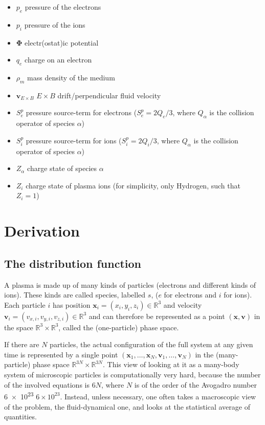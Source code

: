 \documentclass[12pt]{article}
\begin{document}
\begin{itemize}
    \item $p_e$ pressure of the electrons
    \item $p_i$ pressure of the ions
    \item $\bm{\Phi}$ electr(ostat)ic potential
    \item $q_e$ charge on an electron
    \item $\rho_m$ mass density of the medium
    \item $\bm{v}_{E \times B}$ $E \times B$ drift/perpendicular fluid velocity
    \item $S_e^p$ pressure source-term for electrons ($S_e^p = 2Q_e/3$, where $Q_\alpha$ is the collision operator of species $\alpha$)
    \item $S_i^p$ pressure source-term for ions ($S_i^p = 2Q_i/3$, where $Q_\alpha$ is the collision operator of species $\alpha$)
    \item $Z_\alpha$ charge state of species $\alpha$
    \item $Z_i$ charge state of plasma ions (for simplicity, only Hydrogen, such that $Z_i = 1$)
\end{itemize}

\appendix

\section{Derivation}


\subsection{The distribution function}

A plasma is made up of many kinds of particles (electrons and different kinds of ions). These kinds are called species, labelled $s$, ($e$ for electrons and $i$ for ions). Each particle $i$ has position $\bm{x}_i = (x_i, y_i, z_i) \in \mathbb{R}^3$ and velocity $\bm{v}_i = (v_{x,i}, v_{y,i}, v_{z,i}) \in \mathbb{R}^3$ and can therefore be represented as a point $(\bm{x}, \bm{v})$ in the space $\mathbb{R}^3 \times \mathbb{R}^3$, called the (one-particle) phase space.

If there are $N$ particles, the actual configuration of the full system at any given time is represented by a single point $(\bm{x}_1, \dots, \bm{x}_N, \bm{v}_1, \dots, \bm{v}_N)$ in the (many-particle) phase space $\mathbb{R}^{3N} \times \mathbb{R}^{3N}$. This view of looking at it as a many-body system of microscopic particles is computationally very hard, because the number of the involved equations is $6N$, where $N$ is of the order of the Avogadro number \num{6e23} $6 \times 10^23$. Instead, unless necessary, one often takes a macroscopic view of the problem, the fluid-dynamical one, and looks at the statistical average of quantities.
\end{document}
